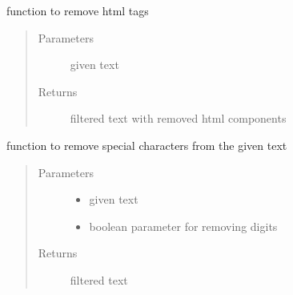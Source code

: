 \documentclass[letterpaper,10pt,english]{sphinxmanual}
\begin{document}
\begin{fulllineitems}
\label{\detokenize{index:data_preprocessing.data_preprocessing.remove_html_tags}}
\sphinxAtStartPar
function to remove html tags
\begin{quote}\begin{description}
\item[{Parameters}] \leavevmode
\sphinxAtStartPar
{} \textendash{} given text

\item[{Returns}] \leavevmode
\sphinxAtStartPar
filtered text with removed html components

\end{description}\end{quote}

\end{fulllineitems}


\begin{fulllineitems}
\label{\detokenize{index:data_preprocessing.data_preprocessing.remove_special_characters}}
\sphinxAtStartPar
function to remove special characters from the given text
\begin{quote}\begin{description}
\item[{Parameters}] \leavevmode\begin{itemize}
\item {} 
\sphinxAtStartPar
{} \textendash{} given text

\item {} 
\sphinxAtStartPar
{} \textendash{} boolean parameter for removing digits

\end{itemize}

\item[{Returns}] \leavevmode
\sphinxAtStartPar
filtered text

\end{description}\end{quote}

\end{fulllineitems}
\end{document}
